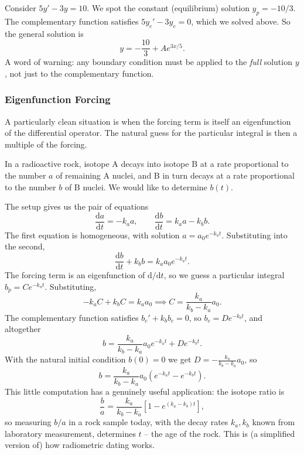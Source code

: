 \begin{example}
	Consider $5y' - 3y = 10$. We spot the constant (equilibrium) solution $y_p = -10/3$. The complementary function satisfies $5y_c' - 3y_c = 0$, which we solved above. So the general solution is
	$$
	y = -\frac{10}{3} + A e^{3x/5}.
	$$
	A word of warning: any boundary condition must be applied to the \emph{full} solution $y$, not just to the complementary function.
\end{example}

\subsubsection{Eigenfunction Forcing}

A particularly clean situation is when the forcing term is itself an eigenfunction of the differential operator. The natural guess for the particular integral is then a multiple of the forcing.

\begin{example}
	In a radioactive rock, isotope A decays into isotope B at a rate proportional to the number $a$ of remaining A nuclei, and B in turn decays at a rate proportional to the number $b$ of B nuclei. We would like to determine $b(t)$.

	The setup gives us the pair of equations
	$$
	\frac{\mathrm{d}a}{\mathrm{d}t} = -k_a a, \qquad \frac{\mathrm{d}b}{\mathrm{d}t} = k_a a - k_b b.
	$$
	The first equation is homogeneous, with solution $a = a_0 e^{-k_a t}$. Substituting into the second,
	$$
	\frac{\mathrm{d}b}{\mathrm{d}t} + k_b b = k_a a_0 e^{-k_a t}.
	$$
	The forcing term is an eigenfunction of $\mathrm{d}/\mathrm{d}t$, so we guess a particular integral $b_p = C e^{-k_a t}$. Substituting,
	$$
	-k_a C + k_b C = k_a a_0 \implies C = \frac{k_a}{k_b - k_a} a_0.
	$$
	The complementary function satisfies $b_c' + k_b b_c = 0$, so $b_c = D e^{-k_b t}$, and altogether
	$$
	b = \frac{k_a}{k_b - k_a} a_0 e^{-k_a t} + D e^{-k_b t}.
	$$
	With the natural initial condition $b(0) = 0$ we get $D = -\frac{k_a}{k_b - k_a}a_0$, so
	$$
	b = \frac{k_a}{k_b - k_a} a_0 \left(e^{-k_a t} - e^{-k_b t}\right).
	$$
	This little computation has a genuinely useful application: the isotope ratio is
	$$
	\frac{b}{a} = \frac{k_a}{k_b - k_a}\left[1 - e^{(k_a - k_b)t}\right],
	$$
	so measuring $b/a$ in a rock sample today, with the decay rates $k_a, k_b$ known from laboratory measurement, determines $t$ -- the age of the rock. This is (a simplified version of) how radiometric dating works.
\end{example}

